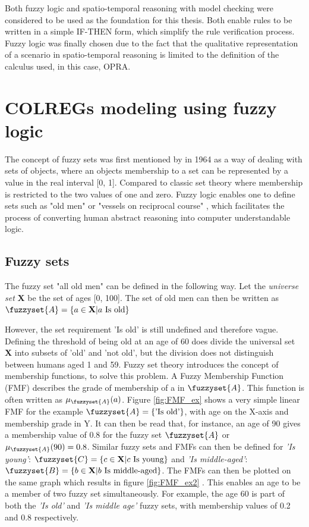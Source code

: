 Both fuzzy logic and spatio-temporal reasoning with model checking were considered to be used as the foundation for this thesis. Both enable rules to be written in a simple IF-THEN form, which simplify the rule verification process. Fuzzy logic was finally chosen due to the fact that the qualitative representation of a scenario in spatio-temporal reasoning is limited to the definition of the calculus used, in this case, OPRA.
\chapter{COLREGs modeling using fuzzy logic}
\label{chap:fuzzy}
The concept of fuzzy sets was first mentioned by \textcite{zadeh1996fuzzy} in 1964 as a way of dealing with sets of objects, where an objects membership to a set can be represented by a value in the real interval [0, 1]. Compared to classic set theory where  membership is restricted to the two values of one and zero. Fuzzy logic enables one to define sets such as "old men" or "vessels on reciprocal course" \cite{zadeh1996fuzzy}, which facilitates the process of converting human abstract reasoning into computer understandable logic.
\section{Fuzzy sets}
\label{sec:fuzzy_sets}
The fuzzy set "all old men" can be defined in the following way. Let the \textit{universe set} \textbf{X} be the set of ages [0, 100]. The set of old men can then be written as
$\fuzzyset{A}=\left \{ a \in \textbf{X} | a \text{ Is old} \right \}$
\cite{chen2000introduction}

However, the set requirement 'Is old' is still undefined and therefore vague. Defining the threshold of being old at an age of 60 does divide the universal set \textbf{X} into subsets of 'old' and 'not old', but the division does not distinguish between humans aged 1 and 59.
Fuzzy set theory introduces the concept of membership functions, to solve this problem. A Fuzzy Membership Function (FMF) describes the grade of membership of a  in  $\fuzzyset{A}$. This function is often written as $\mu_{\fuzzyset{A}}(a)$. Figure \ref{fig:FMF_ex} shows a very simple linear FMF for the example $\fuzzyset{A}=\left \{\text{'Is old'} \right \}$, with age on the X-axis and membership grade in Y. It can then be read that, for instance, an age of 90 gives a membership value of 0.8 for the fuzzy set $\fuzzyset{A}$ or $\mu_{\fuzzyset{A}}(90)=0.8$. Similar fuzzy sets and  FMFs can then be defined for \textit{'Is young'}: $\fuzzyset{C}=\left \{ c \in \textbf{X} | c \text{ Is young} \right \}$ and   \textit{'Is middle-aged'}: $\fuzzyset{B}=\left \{ b \in \textbf{X} | b \text{ Is middle-aged} \right \}$. The FMFs can then be plotted on the same graph which results in figure \ref{fig:FMF_ex2} \cite{ross2009fuzzy}. This enables an age to be a member of two fuzzy set simultaneously. For example, the age 60 is part of both the \textit{'Is old'} and \textit{'Is middle age'} fuzzy sets, with membership values of 0.2 and 0.8 respectively.

